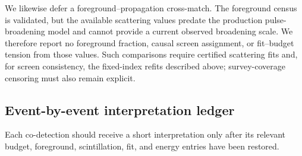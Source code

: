 

We likewise defer a foreground--propagation cross-match. The foreground census
is validated, but the available scattering values predate the production
pulse-broadening model and cannot provide a current observed broadening scale.
We therefore report no foreground fraction, causal screen assignment, or
fit--budget tension from those values. Such comparisons require certified
scattering fits and, for screen consistency, the fixed-index refits described
above; survey-coverage censoring must also remain explicit.

\subsection{Event-by-event interpretation ledger}
\label{sec:disc-sightline-ledger}

Each co-detection should receive a short interpretation only after its relevant
budget, foreground, scintillation, fit, and energy entries have been restored.








